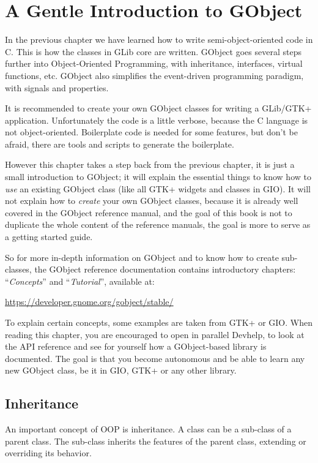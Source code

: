 \chapter{A Gentle Introduction to GObject}
\label{oop-gobject}

In the previous chapter we have learned how to write semi-object-oriented code in C. This is how the classes in GLib core are written. GObject goes several steps further into Object-Oriented Programming, with inheritance, interfaces, virtual functions, etc. GObject also simplifies the event-driven programming paradigm, with signals and properties.

It is recommended to create your own GObject classes for writing a GLib/GTK+ application. Unfortunately the code is a little verbose, because the C language is not object-oriented. Boilerplate code is needed for some features, but don't be afraid, there are tools and scripts to generate the boilerplate.

However this chapter takes a step back from the previous chapter, it is just a small introduction to GObject; it will explain the essential things to know how to \emph{use} an existing GObject class (like all GTK+ widgets and classes in GIO). It will not explain how to \emph{create} your own GObject classes, because it is already well covered in the GObject reference manual, and the goal of this book is not to duplicate the whole content of the reference manuals, the goal is more to serve as a getting started guide.

So for more in-depth information on GObject and to know how to create sub-classes, the GObject reference documentation contains introductory chapters: ``\emph{Concepts}'' and ``\emph{Tutorial}'', available at:

\url{https://developer.gnome.org/gobject/stable/}

To explain certain concepts, some examples are taken from GTK+ or GIO. When reading this chapter, you are encouraged to open in parallel Devhelp, to look at the API reference and see for yourself how a GObject-based library is documented. The goal is that you become autonomous and be able to learn any new GObject class, be it in GIO, GTK+ or any other library.

\section{Inheritance}
\label{oop-gobject-inheritance}

An important concept of OOP is inheritance. A class can be a sub-class of a parent class. The sub-class inherits the features of the parent class, extending or overriding its behavior.

